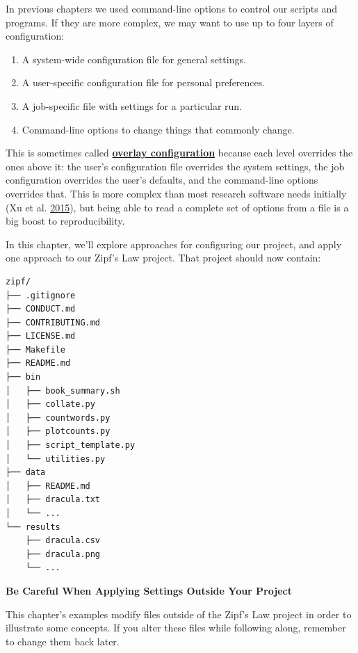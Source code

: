 \documentclass[
]{krantz}
\providecommand{\tightlist}{%
  \setlength{\itemsep}{0pt}\setlength{\parskip}{0pt}}
\renewenvironment{quote}{\begin{VF}}{\end{VF}}
\newcommand{\gref}[2]{\hyperlink{#2}{\textbf{#1}}}
\begin{document}
In previous chapters we used command-line options to control our scripts and programs.
If they are more complex,
we may want to use up to four layers of configuration:

\begin{enumerate}
\def\labelenumi{\arabic{enumi}.}
\tightlist
\item
  A system-wide configuration file for general settings.
\item
  A user-specific configuration file for personal preferences.
\item
  A job-specific file with settings for a particular run.
\item
  Command-line options to change things that commonly change.
\end{enumerate}

This is sometimes called \gref{overlay configuration}{overlay\_configuration}
because each level overrides the ones above it:
the user's configuration file overrides the system settings,
the job configuration overrides the user's defaults,
and the command-line options overrides that.
This is more complex than most research software needs initially (Xu et al. \protect\hyperlink{ref-Xu2015}{2015}),
but being able to read a complete set of options from a file
is a big boost to reproducibility.

In this chapter,
we'll explore approaches for configuring our project,
and apply one approach to our Zipf's Law project.
That project should now contain:

\begin{verbatim}
zipf/
├── .gitignore
├── CONDUCT.md
├── CONTRIBUTING.md
├── LICENSE.md
├── Makefile
├── README.md
├── bin
│   ├── book_summary.sh
│   ├── collate.py
│   ├── countwords.py
│   ├── plotcounts.py
│   ├── script_template.py
│   └── utilities.py
├── data
│   ├── README.md
│   ├── dracula.txt
│   └── ...
└── results
    ├── dracula.csv
    ├── dracula.png
    └── ...
\end{verbatim}

\begin{quote}
\textbf{Be Careful When Applying Settings Outside Your Project}

This chapter's examples modify files outside of the Zipf's Law project
in order to illustrate some concepts.
If you alter these files while following along,
remember to change them back later.
\end{quote}
\end{document}
